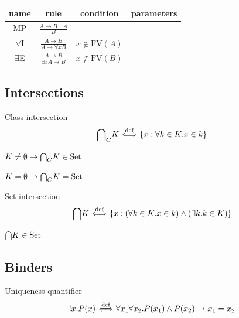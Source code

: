 \documentclass[10pt,a4paper]{article}
\begin{document}
\begin{table}[H]
\centering
\begin{tabular}{|c|c|c|c|}
\hline
name & rule & condition & parameters \\ \hline
\hline
MP &  \rule[-2.5ex]{0pt}{7ex} $\frac{A\to B\quad A}{B}$ & - \\ \hline %
\hline
\rule[-2.5ex]{0pt}{7ex}
$\forall$I & $\frac{A\to B}{A\to \forall x B}$ & $x \notin \textrm{FV}(A)$\\ \hline %
\hline
\rule[-2.5ex]{0pt}{7ex}
$\exists$E & $\frac{A\to B}{\exists x A\to B}$ & $x \notin \textrm{FV}(B)$\\ %
\hline
\end{tabular}
\end{table}

\subsection{Intersections}
\begin{definition} Class intersection
$${{\bigcap}_C} K {\stackrel{{\textrm{def}}}{\ \Longleftrightarrow\ }} \{x: \forall k\in K. x\in k\}$$
\end{definition}

\begin{exercise}
$K\neq \emptyset \to {{\bigcap}_C} K \in {\textrm{Set}}$
\end{exercise}

\begin{exercise}
$K=\emptyset \to {{\bigcap}_C} K = {\textrm{Set}}$
\end{exercise}

\begin{definition} Set intersection
$${\bigcap} K {\stackrel{{\textrm{def}}}{\ \Longleftrightarrow\ }} \{x: (\forall k\in K. x\in k)\land (\exists k.k\in K)\}$$
\end{definition}

\begin{exercise}
${\bigcap} K \in {\textrm{Set}}$
\end{exercise}
\subsection{Binders}
\begin{definition} Uniqueness quantifier
$$!x. P(x) {\stackrel{{\textrm{def}}}{\ \Longleftrightarrow\ }} \forall x_1 \forall x_2. P(x_1)\land P(x_2)\to x_1=x_2$$
\end{definition}
\end{document}
